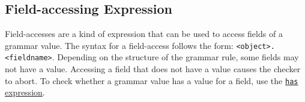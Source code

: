 
\subsection{Field-accessing Expression}
{
	Field-accesses are a kind of expression that can be used to access fields
	of a grammar value.
	The syntax for a field-access follows the
	form: \texttt{<object>.<fieldname>}.
	Depending on the structure of the grammar rule,
	some fields may not have a value. Accessing a field that does not
	have a value causes the checker to abort. To check whether a grammar value
	has a value for a field, use the
	\hyperref[subsec:possession]{\texttt{has} expression}.
}
